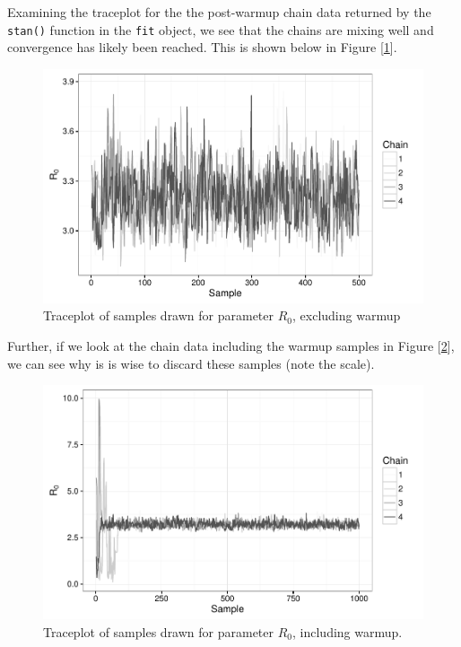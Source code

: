     Examining the traceplot for the the post-warmup chain data returned by the \verb|stan()| function in the \verb|fit| object, we see that the chains are mixing well and convergence has likely been reached. This is shown below in Figure [\ref{traceplot}].

    \begin{figure}
        \centering
        \includegraphics[width=\textwidth]{./images/traceplotR0.pdf}
        \caption{Traceplot of samples drawn for parameter $R_0$, excluding warmup \label{traceplot}}
    \end{figure}

    Further, if we look at the chain data including the warmup samples in Figure [\ref{traceplot2}], we can see why is is wise to discard these samples (note the scale).

    \begin{figure}
        \centering
        \includegraphics[width=\textwidth]{./images/traceplotR0_inc.pdf}
        \caption{Traceplot of samples drawn for parameter $R_0$, including warmup. \label{traceplot2}}
    \end{figure}

